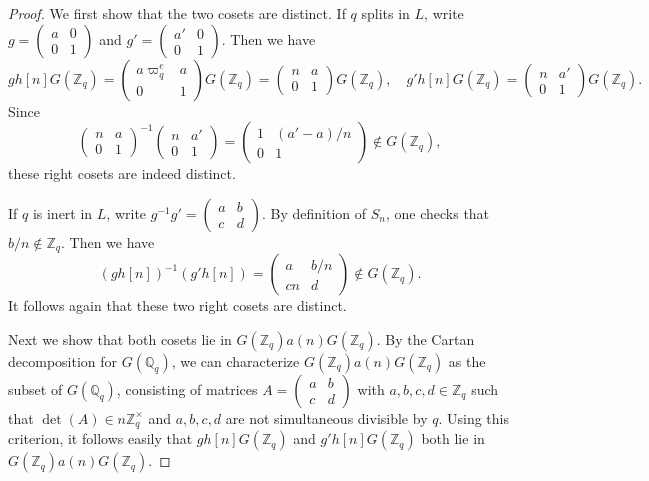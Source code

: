 \documentclass[10pt,a4paper]{amsart}
\newcommand{\Q}{\mathbb{Q}}
\newcommand{\Z}{\mathbb{Z}}
\begin{document}
		\begin{proof}
			We first show that the two cosets are distinct.
			If $q$ splits in $L$, write $g=\begin{pmatrix}
				a & 0 \\ 0 & 1
			\end{pmatrix}$ and $g'=\begin{pmatrix}
				a' & 0 \\ 0 & 1
			\end{pmatrix}$. Then we have
			\[
			gh[n]G(\Z_q)
			=
			\begin{pmatrix}
				a\varpi_q^e & a \\ 0 & 1
			\end{pmatrix}
			G(\Z_q)
			=
			\begin{pmatrix}
				n & a \\ 0 & 1
			\end{pmatrix}
			G(\Z_q),
			\quad
			g'h[n]G(\Z_q)
			=
			\begin{pmatrix}
				n & a' \\ 0 & 1
			\end{pmatrix}
			G(\Z_q).
			\]
			Since 
			\[
			\begin{pmatrix}
				n & a \\ 0 & 1
			\end{pmatrix}^{-1}
			\begin{pmatrix}
				n & a' \\ 0 & 1
			\end{pmatrix}
			=
			\begin{pmatrix}
				1 & (a'-a)/n \\ 0 & 1
			\end{pmatrix}\notin G(\Z_q),
			\]
			these right cosets are indeed distinct.
			
			
			
			
			If $q$ is inert in $L$, write
			$g^{-1}g'=\begin{pmatrix}
				a & b \\ c & d
			\end{pmatrix}$. By definition of $S_n$, one checks that $b/n\notin\Z_q$. Then we have
			\[
			(gh[n])^{-1}(g'h[n])
			=
			\begin{pmatrix}
				a & b/n \\ cn & d
			\end{pmatrix}\notin G(\Z_q).
			\]
			It follows again that these two right cosets are distinct.
			
			
			
			
			Next we show that both cosets lie in $G(\Z_q)a(n)G(\Z_q)$. By the Cartan decomposition for $G(\Q_q)$, we can characterize $G(\Z_q)a(n)G(\Z_q)$ as the subset of $G(\Q_q)$, consisting of matrices $A=\begin{pmatrix}
				a & b \\ c & d
			\end{pmatrix}$ with $a,b,c,d\in\Z_q$ such that $\det(A)\in n\Z_q^\times$ and $a,b,c,d$ are not simultaneous divisible by $q$. Using this criterion, it follows easily that $gh[n]G(\Z_q)$ and $g'h[n]G(\Z_q)$ both lie in $G(\Z_q)a(n)G(\Z_q)$.
		\end{proof}
\end{document}
